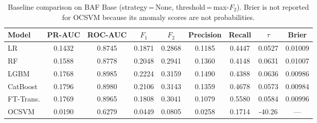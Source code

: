 \begin{table}[ht!]
\centering
\caption{Baseline comparison on BAF Base (strategy\,=\,None, threshold\,=\,max-$F_2$). Brier is not reported for OCSVM because its anomaly scores are not probabilities.}
\label{tab:baseline_baf}
\begin{tabular}{l c c c c c c c c}
\toprule
Model & PR-AUC & ROC-AUC & $F_1$ & $F_2$ & Precision & Recall & $\tau$ & Brier \\
\midrule
LR         & 0.1432 & 0.8745 & 0.1871 & 0.2868 & 0.1185 & 0.4447 & 0.0527 & 0.01009 \\
RF         & 0.1588 & 0.8778 & 0.2048 & 0.2941 & 0.1360 & 0.4148 & 0.0631 & 0.01007 \\
LGBM       & 0.1768 & 0.8985 & 0.2224 & 0.3159 & 0.1490 & 0.4388 & 0.0636 & 0.00986 \\
CatBoost   & 0.1796 & 0.8980 & 0.2106 & 0.3143 & 0.1359 & 0.4678 & 0.0573 & 0.00984 \\
FT-Trans.  & 0.1769 & 0.8965 & 0.1808 & 0.3041 & 0.1079 & 0.5580 & 0.0584 & 0.00996 \\
OCSVM      & 0.0190 & 0.6279 & 0.0449 & 0.0805 & 0.0258 & 0.1714 & -40.26 & --- \\
\bottomrule
\end{tabular}
\end{table}